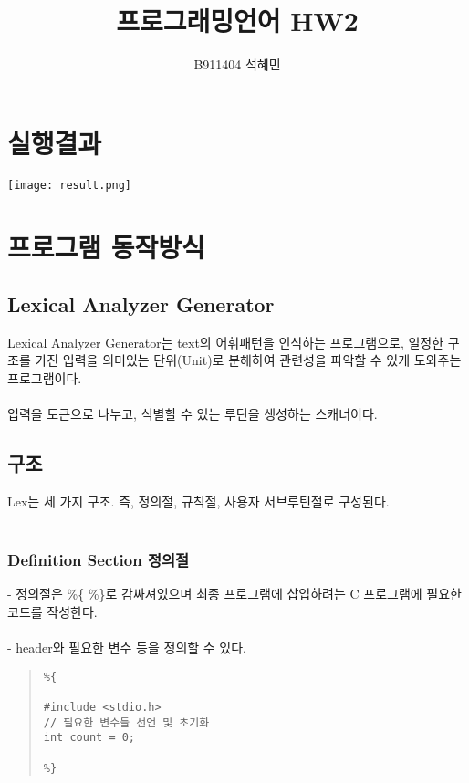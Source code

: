 \documentclass{article}
\title{프로그래밍언어 HW2}
\author{B911404 석혜민}
\begin{document}
\maketitle

\section{실행결과}
\texttt{[image: result.png]}

\section{프로그램 동작방식}
\subsection{Lexical Analyzer Generator}
Lexical Analyzer Generator는 text의 어휘패턴을 인식하는 프로그램으로, 일정한 구조를 가진 입력을 의미있는 단위{\footnotesize (Unit)}로 분해하여 관련성을 파악할 수 있게 도와주는 프로그램이다.\\ \\
입력을 토큰으로 나누고, 식별할 수 있는 루틴을 생성하는 스캐너이다.

\subsection{구조}
Lex는 세 가지 구조. 즉, 정의절, 규칙절, 사용자 서브루틴절로 구성된다. \\ \\

\subsubsection{Definition Section 정의절}
- 정의절은 \%\{ \%\}로 감싸져있으며 최종 프로그램에 삽입하려는 C 프로그램에 필요한 코드를 작성한다. \\ \\
- header와 필요한 변수 등을 정의할 수 있다.

\begin{quote}
\begin{verbatim}
%{

#include <stdio.h>
// 필요한 변수들 선언 및 초기화
int count = 0;

%}
\end{verbatim}
\end{quote}
\end{document}
